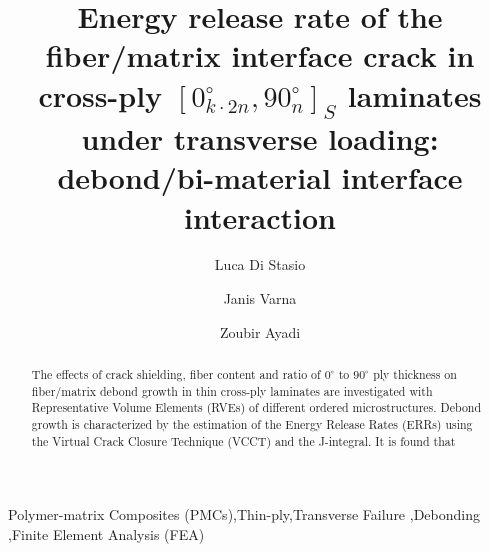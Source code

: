 \documentclass[review]{elsarticle}
\begin{document}
\begin{frontmatter}

\title{Energy release rate of the fiber/matrix interface crack in cross-ply $\left[0_{k\cdot2n}^{\circ},90_{n}^{\circ}\right]_{S}$ laminates under transverse loading: debond/bi-material interface interaction}


\author[nancy,lulea]{Luca Di Stasio}
\author[lulea]{Janis Varna}
\author[nancy]{Zoubir Ayadi}


\address[nancy]{Universit\'e de Lorraine, EEIGM, IJL, 6 Rue Bastien Lepage, F-54010 Nancy, France}
\address[lulea]{Lule\aa\ University of Technology, University Campus, SE-97187 Lule\aa, Sweden}

\begin{abstract}
\noindent
The effects of crack shielding, fiber content and ratio of $0^{\circ}$ to $90^{\circ}$ ply thickness on fiber/matrix debond growth in thin cross-ply laminates are investigated with Representative Volume Elements (RVEs) of different ordered microstructures. Debond growth is characterized by the estimation of the Energy Release Rates (ERRs) using the Virtual Crack Closure Technique (VCCT) and the J-integral. It is found that 
\end{abstract}

\begin{keyword}
Polymer-matrix Composites (PMCs)\sep Thin-ply\sep Transverse Failure \sep Debonding \sep Finite Element Analysis (FEA)
\end{keyword}


\end{frontmatter}
\end{document}
